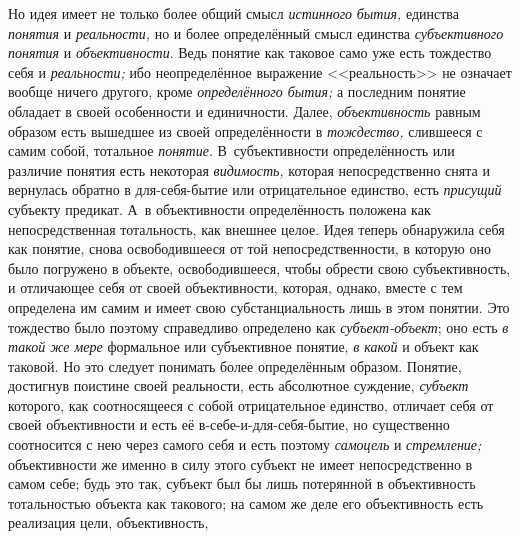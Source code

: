 Но идея имеет не только более общий смысл {\em истинного} {\em бытия,} единства
{\em понятия} и {\em реальности,} но и более определённый смысл единства
{\em субъективного понятия} и {\em объективности}. Ведь понятие как таковое
само уже есть тождество себя и {\em реальности;} ибо неопределённое выражение
<<реальность>> не означает вообще ничего другого, кроме {\em определённого
бытия;} а последним понятие обладает в своей особенности и единичности. Далее,
{\em объективность} равным образом есть вышедшее из своей определённости
в {\em тождество,} слившееся с самим собой, тотальное {\em понятие}.
В~субъективности определённость или различие понятия есть некоторая
{\em видимость,} которая непосредственно снята и вернулась обратно
в для-себя-бытие или отрицательное единство, есть {\em присущий} субъекту
предикат. А~в объективности определённость положена как непосредственная
тотальность, как внешнее целое. Идея теперь обнаружила себя как понятие,
снова освободившееся от той непосредственности, в которую оно было
погружено в объекте, освободившееся, чтобы обрести свою субъективность, и
отличающее себя от своей объективности, которая, однако, вместе с тем
определена им самим и имеет свою субстанциальность лишь в этом понятии. Это
тождество было поэтому справедливо определено как
{\em субъект-объект}; оно есть {\em в такой же
мере} формальное или субъективное понятие,
{\em в какой} и объект
как таковой. Но это следует понимать более определённым образом. Понятие,
достигнув поистине своей реальности, есть абсолютное суждение,
{\em субъект} которого,
как соотносящееся с собой отрицательное единство, отличает
себя от своей объективности и есть её в-себе-и-для-себя-бытие, но
существенно соотносится с нею через самого себя и есть поэтому
{\em самоцель} и {\em стремление;}
объективности же именно в силу этого субъект не имеет
непосредственно в самом себе; будь это так, субъект был бы лишь потерянной
в объективность тотальностью объекта как такового; на самом же деле его
объективность есть реализация цели, объективность,
